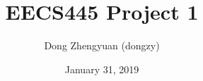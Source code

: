 \documentclass{article}
\title{EECS445 Project 1}
\author{Dong Zhengyuan (dongzy)}
\date{January 31, 2019}
\begin{document}
\maketitle

\begin{enumerate}

\end{enumerate}
\end{document}
